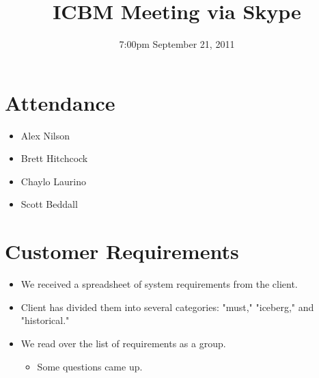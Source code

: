 \documentclass{article}
\begin{document}
\title{ICBM Meeting via Skype}
\date{7:00pm September 21, 2011}
\maketitle

\section{Attendance}
\begin{itemize}
\item Alex Nilson
\item Brett Hitchcock
\item Chaylo Laurino
\item Scott Beddall
\end{itemize}

\section{Customer Requirements}
\begin{itemize}
\item We received a spreadsheet of system requirements from the client.
\item Client has divided them into several categories: "must," "iceberg," and "historical."
\item We read over the list of requirements as a group.
	\begin{itemize}
	\item Some questions came up.
	\end{itemize}
\end{itemize}
\end{document}
